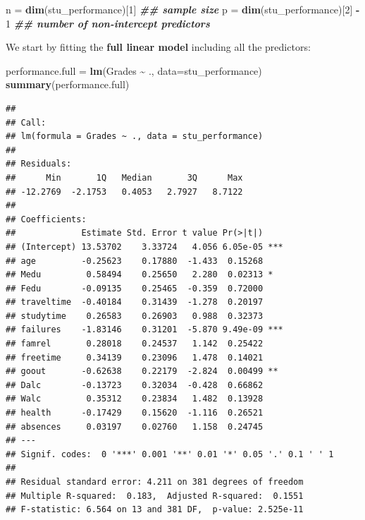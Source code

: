 \documentclass[
]{book}
\newenvironment{Shaded}{\begin{snugshade}}{\end{snugshade}}
\newcommand{\AttributeTok}[1]{\textcolor[rgb]{0.13,0.29,0.53}{#1}}
\newcommand{\DecValTok}[1]{\textcolor[rgb]{0.00,0.00,0.81}{#1}}
\newcommand{\DocumentationTok}[1]{\textcolor[rgb]{0.56,0.35,0.01}{\textbf{\textit{#1}}}}
\newcommand{\FunctionTok}[1]{\textcolor[rgb]{0.13,0.29,0.53}{\textbf{#1}}}
\newcommand{\NormalTok}[1]{#1}
\newcommand{\OtherTok}[1]{\textcolor[rgb]{0.56,0.35,0.01}{#1}}
\newcommand{\SpecialCharTok}[1]{\textcolor[rgb]{0.81,0.36,0.00}{\textbf{#1}}}
\begin{document}
\begin{Shaded}
\begin{Highlighting}[]
\NormalTok{n }\OtherTok{=} \FunctionTok{dim}\NormalTok{(stu\_performance)[}\DecValTok{1}\NormalTok{] }\DocumentationTok{\#\# sample size}
\NormalTok{p }\OtherTok{=} \FunctionTok{dim}\NormalTok{(stu\_performance)[}\DecValTok{2}\NormalTok{] }\SpecialCharTok{{-}} \DecValTok{1} \DocumentationTok{\#\# number of non{-}intercept predictors}
\end{Highlighting}
\end{Shaded}

We start by fitting the \textbf{full linear model} including all the predictors:

\begin{Shaded}
\begin{Highlighting}[]
\NormalTok{performance.full }\OtherTok{=} \FunctionTok{lm}\NormalTok{(Grades }\SpecialCharTok{\textasciitilde{}}\NormalTok{ ., }\AttributeTok{data=}\NormalTok{stu\_performance)}
\FunctionTok{summary}\NormalTok{(performance.full)}
\end{Highlighting}
\end{Shaded}

\begin{verbatim}
## 
## Call:
## lm(formula = Grades ~ ., data = stu_performance)
## 
## Residuals:
##      Min       1Q   Median       3Q      Max 
## -12.2769  -2.1753   0.4053   2.7927   8.7122 
## 
## Coefficients:
##             Estimate Std. Error t value Pr(>|t|)    
## (Intercept) 13.53702    3.33724   4.056 6.05e-05 ***
## age         -0.25623    0.17880  -1.433  0.15268    
## Medu         0.58494    0.25650   2.280  0.02313 *  
## Fedu        -0.09135    0.25465  -0.359  0.72000    
## traveltime  -0.40184    0.31439  -1.278  0.20197    
## studytime    0.26583    0.26903   0.988  0.32373    
## failures    -1.83146    0.31201  -5.870 9.49e-09 ***
## famrel       0.28018    0.24537   1.142  0.25422    
## freetime     0.34139    0.23096   1.478  0.14021    
## goout       -0.62638    0.22179  -2.824  0.00499 ** 
## Dalc        -0.13723    0.32034  -0.428  0.66862    
## Walc         0.35312    0.23834   1.482  0.13928    
## health      -0.17429    0.15620  -1.116  0.26521    
## absences     0.03197    0.02760   1.158  0.24745    
## ---
## Signif. codes:  0 '***' 0.001 '**' 0.01 '*' 0.05 '.' 0.1 ' ' 1
## 
## Residual standard error: 4.211 on 381 degrees of freedom
## Multiple R-squared:  0.183,  Adjusted R-squared:  0.1551 
## F-statistic: 6.564 on 13 and 381 DF,  p-value: 2.525e-11
\end{verbatim}
\end{document}
